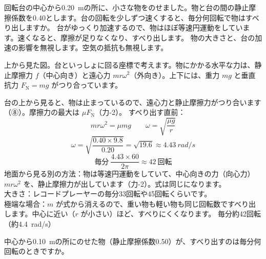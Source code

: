 \begin{phreidai}[回転台の上の物がすべり出す回転数]\label{ph:力-7:ex13}
回転台の中心から\qty{0.20}{m}の所に、小さな物をのせました。物と台の間の静止摩擦係数を0.40とします。台の回転を少しずつ速くすると、毎分何回転で物はすべり出しますか。
\phbamen
台がゆっくり加速するので、物はほぼ等速円運動をしています。速くなると、摩擦が足りなくなり、すべり出します。
\phmushi
物の大きさと、台の加速の影響を無視します。空気の抵抗も無視します。
\phzu
\noindent\begin{minipage}[c]{0.36\linewidth}\centering
{}
\end{minipage}\hfill
\begin{minipage}[c]{0.6\linewidth}
上から見た図。台といっしょに回る座標で考えます。物にかかる水平な力は、静止摩擦力 $f$（中心向き）と遠心力 $mr\omega^2$（外向き）。上下には、重力 $mg$ と垂直抗力 $F_{\mathrm N}=mg$ がつり合っています。
\end{minipage}
\phriyu
台の上から見ると、物は止まっているので、遠心力と静止摩擦力がつり合います（⑧）。摩擦力の最大は $\mu F_{\mathrm N}$（力-2）。
\phtateru
すべり出す直前：
\[mr\omega^2=\mu mg\qquad\omega=\sqrt{\frac{\mu g}{r}}\]
\phtoku
\[\omega=\sqrt{\frac{0.40\times9.8}{0.20}}=\sqrt{19.6}\approx\qty{4.43}{rad/s}\]
\[\text{毎分}\ \frac{4.43\times60}{2\pi}\approx42\ \text{回転}\]
\phtashikame
地面から見る別の方法：物は等速円運動をしていて、中心向きの力（向心力）$mr\omega^2$ を、静止摩擦力が出しています（力-2）。式は同じになります。\\
大きさ：レコードプレーヤーの毎分33回転や45回転くらいです。\\
極端な場合：$m$ が式から消えるので、重い物も軽い物も同じ回転数ですべり出します。中心に近い（$r$ が小さい）ほど、すべりにくくなります。
\kotae 毎分約42回転（約\qty{4.4}{rad/s}）
\end{phreidai}
\begin{jibun}
中心から\qty{0.10}{m}の所にのせた物（静止摩擦係数0.50）が、すべり出すのは毎分何回転のときですか。
\end{jibun}

